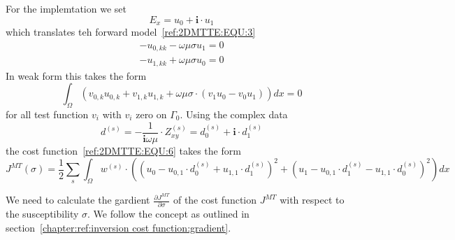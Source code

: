 For the implemtation we set
\begin{equation}\label{ref:2DMTTE:EQU:100}
E_x  = u_0 + \mathbf{i} \cdot u_1
\end{equation}
which translates teh forward model~\ref{ref:2DMTTE:EQU:3}
\begin{align}\label{ref:2DMTTE:EQU:103}
- u_{0,kk}  - \omega \mu \sigma u_1 = 0 \\
- u_{1,kk}  + \omega \mu \sigma u_0 = 0 
\end{align}
In weak form this takes the form 
\begin{equation}\label{ref:2DMTTE:EQU:104}
\int_{\Omega}
\left(
v_{0,k}u_{0,k}
+ v_{1,k}u_{1,k}
+ \omega \mu \sigma \cdot ( v_1 u_0 - v_0 u_1) \right) dx =0  
\end{equation}
for all test function $v_i$ with $v_i$ zero on $\Gamma_0$. 
Using the complex data 
\begin{equation}\label{ref:2DMTTE:EQU:105}
d^{(s)} = - \frac{1}{\mathbf{i} \omega \mu} \cdot Z_{xy}^{(s)} = d^{(s)}_0 +  \mathbf{i} \cdot d_1^{(s)}
\end{equation}
the cost function~\ref{ref:2DMTTE:EQU:6} takes the form
\begin{equation}\label{ref:2DMTTE:EQU:106}
J^{MT}(\sigma)=
\frac{1}{2}\sum_{s} \int_{\Omega} w^{(s)} \cdot \left(  (u_0- u_{0,1} \cdot d_0^{(s)} + u_{1,1} \cdot d_1^{(s)}  )^2 
 + ( u_1- u_{0,1} \cdot d_1^{(s)} -u_{1,1} \cdot d_0^{(s)} )^2 \right) dx 
\end{equation} 

We need to calculate the gardient 
$\frac{\partial J^{MT}}{\partial \sigma}$ of the cost function $J^{{MT}}$ with
respect to the susceptibility $\sigma$.  We follow the concept as outlined in section~\ref{chapter:ref:inversion cost function:gradient}.

